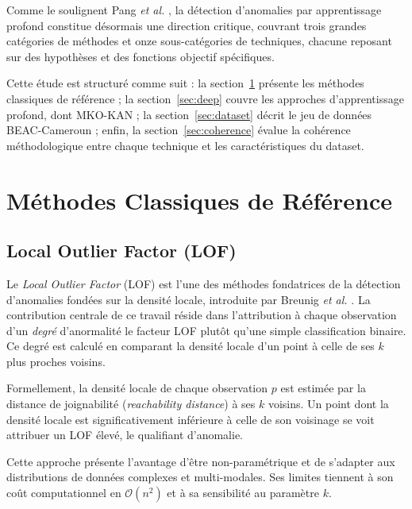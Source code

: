 \documentclass[12pt, a4paper]{article}
\begin{document}
Comme le soulignent Pang \textit{et al.} \cite{pang2021deep}, la détection
d'anomalies par apprentissage profond constitue désormais une direction
critique, couvrant trois grandes catégories de méthodes et onze sous-catégories
de techniques, chacune reposant sur des hypothèses et des fonctions objectif
spécifiques.

Cette étude est structuré comme suit : la section~\ref{sec:methodes_classiques}
présente les méthodes classiques de référence ; la section~\ref{sec:deep}
couvre les approches d'apprentissage profond, dont MKO-KAN ; la
section~\ref{sec:dataset} décrit le jeu de données BEAC-Cameroun ; enfin,
la section~\ref{sec:coherence} évalue la cohérence méthodologique entre chaque
technique et les caractéristiques du dataset.


\section{Méthodes Classiques de Référence}
\label{sec:methodes_classiques}

\subsection{Local Outlier Factor (LOF)}

Le \textit{Local Outlier Factor} (LOF) est l'une des méthodes fondatrices
de la détection d'anomalies fondées sur la densité locale, introduite par
Breunig \textit{et al.} \cite{breunig2000lof}. La contribution centrale de
ce travail réside dans l'attribution à chaque observation d'un \textit{degré}
d'anormalité  le facteur LOF  plutôt qu'une simple classification
binaire. Ce degré est calculé en comparant la densité locale d'un point à
celle de ses $k$ plus proches voisins.

Formellement, la densité locale de chaque observation $p$ est estimée par la
distance de joignabilité (\textit{reachability distance}) à ses $k$ voisins.
Un point dont la densité locale est significativement inférieure à celle de
son voisinage se voit attribuer un LOF élevé, le qualifiant d'anomalie.

Cette approche présente l'avantage d'être non-paramétrique et de s'adapter
aux distributions de données complexes et multi-modales. Ses limites tiennent
à son coût computationnel en $\mathcal{O}(n^2)$ et à sa sensibilité au
paramètre $k$.
\end{document}
